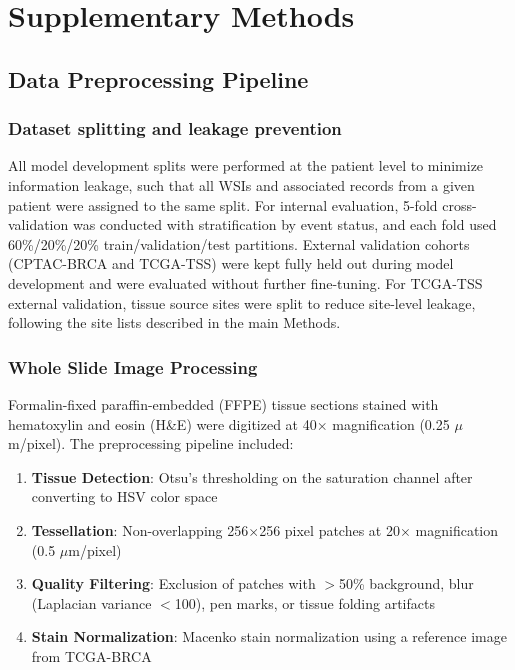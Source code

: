 \documentclass[11pt,a4paper]{article}
\begin{document}
\section{Supplementary Methods}

\subsection{Data Preprocessing Pipeline}

\subsubsection{Dataset splitting and leakage prevention}
All model development splits were performed at the patient level to minimize information leakage, such that all WSIs and associated records from a given patient were assigned to the same split. For internal evaluation, 5-fold cross-validation was conducted with stratification by event status, and each fold used 60\%/20\%/20\% train/validation/test partitions. External validation cohorts (CPTAC-BRCA and TCGA-TSS) were kept fully held out during model development and were evaluated without further fine-tuning. For TCGA-TSS external validation, tissue source sites were split to reduce site-level leakage, following the site lists described in the main Methods.

\subsubsection{Whole Slide Image Processing}
Formalin-fixed paraffin-embedded (FFPE) tissue sections stained with hematoxylin and eosin (H\&E) were digitized at 40$\times$ magnification (0.25 $\mu$m/pixel). The preprocessing pipeline included:

\begin{enumerate}
    \item \textbf{Tissue Detection}: Otsu's thresholding on the saturation channel after converting to HSV color space
    \item \textbf{Tessellation}: Non-overlapping 256$\times$256 pixel patches at 20$\times$ magnification (0.5 $\mu$m/pixel)
    \item \textbf{Quality Filtering}: Exclusion of patches with $>$50\% background, blur (Laplacian variance $<$100), pen marks, or tissue folding artifacts
    \item \textbf{Stain Normalization}: Macenko stain normalization using a reference image from TCGA-BRCA
\end{enumerate}
\end{document}
